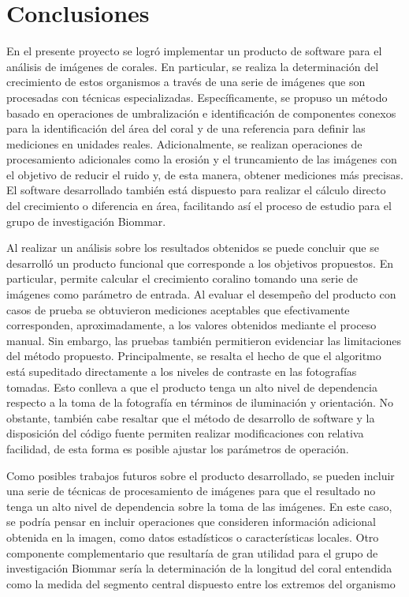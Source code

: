 \documentclass[journal]{IEEEtran}
\begin{document}
\section{Conclusiones}
\begin{par}
En el presente proyecto se logró implementar un producto de software para
el análisis de imágenes de corales. En particular, se realiza la
determinación del crecimiento de estos organismos a través de una serie
de imágenes que son procesadas con técnicas especializadas.
Específicamente, se propuso un método basado en operaciones de
umbralización e identificación de componentes conexos para la
identificación del área del coral y de una referencia para definir las
mediciones en unidades reales. Adicionalmente, se realizan operaciones de
procesamiento adicionales como la erosión y el truncamiento de las
imágenes con el objetivo de reducir el ruido y, de esta manera, obtener
mediciones más precisas. El software desarrollado también está dispuesto
para realizar el cálculo directo del crecimiento o diferencia en área,
facilitando así el proceso de estudio para el grupo de investigación
Biommar.\\
\end{par}
\begin{par}
Al realizar un análisis sobre los resultados obtenidos se puede concluir
que se desarrolló un producto funcional que corresponde a los objetivos
propuestos. En particular, permite calcular el crecimiento coralino
tomando una serie de imágenes como parámetro de entrada. Al evaluar el
desempeño del producto con casos de prueba se obtuvieron mediciones
aceptables que efectivamente corresponden, aproximadamente, a los valores
obtenidos mediante el proceso manual. Sin embargo, las pruebas también
permitieron evidenciar las limitaciones del método propuesto.
Principalmente, se resalta el hecho de que el algoritmo está supeditado
directamente a los niveles de contraste en las fotografías tomadas. Esto
conlleva a que el producto tenga un alto nivel de dependencia respecto a
la toma de la fotografía en términos de iluminación y orientación. No
obstante, también cabe resaltar que el método de desarrollo de software y
la disposición del código fuente permiten realizar modificaciones con
relativa facilidad, de esta forma es posible ajustar los parámetros de
operación.\\
\end{par}
\begin{par}
Como posibles trabajos futuros sobre el producto desarrollado, se pueden incluir una serie de técnicas de procesamiento de imágenes para que el resultado no tenga un alto nivel de dependencia sobre la toma de las imágenes. En este caso, se podría pensar en incluir operaciones que consideren información adicional obtenida en la imagen, como datos estadísticos o características locales. Otro componente complementario que resultaría de gran utilidad para el grupo de investigación Biommar sería la determinación de la longitud del coral entendida como la medida del segmento central dispuesto entre los extremos del organismo
\end{par}
\end{document}
